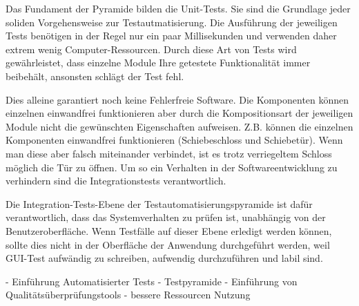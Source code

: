 Das Fundament der Pyramide bilden die Unit-Tests. Sie sind die Grundlage jeder soliden Vorgehensweise zur Testautmatisierung. Die Ausführung der jeweiligen Tests benötigen in der Regel nur ein paar Millisekunden und verwenden daher extrem wenig Computer-Ressourcen. Durch diese Art von Tests wird gewährleistet, dass einzelne Module Ihre getestete Funktionalität immer beibehält, ansonsten schlägt der Test fehl. 

Dies alleine garantiert noch keine Fehlerfreie Software. Die Komponenten können einzelnen einwandfrei funktionieren aber durch die Kompositionsart der jeweiligen Module nicht die gewünschten Eigenschaften aufweisen. Z.B. können die einzelnen Komponenten einwandfrei funktionieren (Schiebeschloss und Schiebetür). Wenn man diese aber falsch miteinander verbindet, ist es trotz verriegeltem Schloss möglich die Tür zu öffnen. Um so ein Verhalten in der Softwareentwicklung zu verhindern sind die Integrationstests verantwortlich. 

Die Integration-Tests-Ebene der Testautomatisierungspyramide ist dafür verantwortlich, dass das
Systemverhalten zu prüfen ist, unabhängig von der Benutzeroberfläche. Wenn Testfälle auf dieser
Ebene erledigt werden können, sollte dies nicht in der Oberfläche der Anwendung durchgeführt
werden, weil  GUI-Test aufwändig zu schreiben, aufwendig durchzuführen und labil sind. 

- Einführung Automatisierter Tests
- Testpyramide
- Einführung von Qualitätsüberprüfungstools 
- bessere Ressourcen Nutzung

